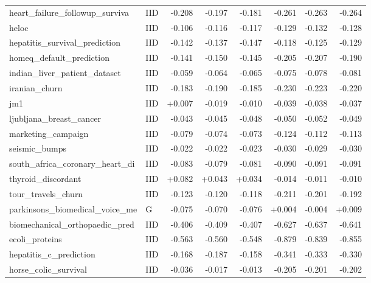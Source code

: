 \begin{longtable}{@{}p{3.95cm}lrrrrrr@{}}
heart\_\allowbreak{}failure\_\allowbreak{}followup\_\allowbreak{}surviva & IID & -0.208 & -0.197 & -0.181 & -0.261 & -0.263 & -0.264\\
heloc & IID & -0.106 & -0.116 & -0.117 & -0.129 & -0.132 & -0.128\\
hepatitis\_\allowbreak{}survival\_\allowbreak{}prediction & IID & -0.142 & -0.137 & -0.147 & -0.118 & -0.125 & -0.129\\
homeq\_\allowbreak{}default\_\allowbreak{}prediction & IID & -0.141 & -0.150 & -0.145 & -0.205 & -0.207 & -0.190\\
indian\_\allowbreak{}liver\_\allowbreak{}patient\_\allowbreak{}dataset & IID & -0.059 & -0.064 & -0.065 & -0.075 & -0.078 & -0.081\\
iranian\_\allowbreak{}churn & IID & -0.183 & -0.190 & -0.185 & -0.230 & -0.223 & -0.220\\
jm1 & IID & +0.007 & -0.019 & -0.010 & -0.039 & -0.038 & -0.037\\
ljubljana\_\allowbreak{}breast\_\allowbreak{}cancer & IID & -0.043 & -0.045 & -0.048 & -0.050 & -0.052 & -0.049\\
marketing\_\allowbreak{}campaign & IID & -0.079 & -0.074 & -0.073 & -0.124 & -0.112 & -0.113\\
seismic\_\allowbreak{}bumps & IID & -0.022 & -0.022 & -0.023 & -0.030 & -0.029 & -0.030\\
south\_\allowbreak{}africa\_\allowbreak{}coronary\_\allowbreak{}heart\_\allowbreak{}di & IID & -0.083 & -0.079 & -0.081 & -0.090 & -0.091 & -0.091\\
thyroid\_\allowbreak{}discordant & IID & +0.082 & +0.043 & +0.034 & -0.014 & -0.011 & -0.010\\
tour\_\allowbreak{}travels\_\allowbreak{}churn & IID & -0.123 & -0.120 & -0.118 & -0.211 & -0.201 & -0.192\\
parkinsons\_\allowbreak{}biomedical\_\allowbreak{}voice\_\allowbreak{}me & G & -0.075 & -0.070 & -0.076 & +0.004 & -0.004 & +0.009\\
\midrule
biomechanical\_\allowbreak{}orthopaedic\_\allowbreak{}pred & IID & -0.406 & -0.409 & -0.407 & -0.627 & -0.637 & -0.641\\
ecoli\_\allowbreak{}proteins & IID & -0.563 & -0.560 & -0.548 & -0.879 & -0.839 & -0.855\\
hepatitis\_\allowbreak{}c\_\allowbreak{}prediction & IID & -0.168 & -0.187 & -0.158 & -0.341 & -0.333 & -0.330\\
horse\_\allowbreak{}colic\_\allowbreak{}survival & IID & -0.036 & -0.017 & -0.013 & -0.205 & -0.201 & -0.202\\

\end{longtable}
